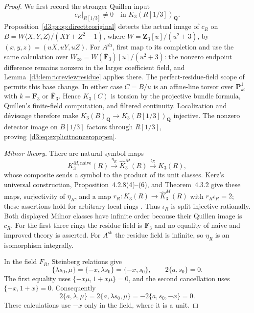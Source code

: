 \begin{proof}
We first record the stronger Quillen input
\begin{equation}\label{d3:eq:explicitnonzeropopen}
 c_R|_{R[1/3]}\ne0\quad\text{in }K_3(R[1/3])_{\mathbf Q}.
\end{equation}
Proposition~\ref{d3:prop:directtcoriginal} detects the actual image of
$c_R$ on
$B=W\langle X,Y,Z\rangle/(XY+Z^2-1)$, where
$W=\mathbf Z_3[u]/(u^2+3)$, by $(x,y,z)=(uX,uY,uZ)$.
For $A^{\mathrm{sh}}$, first map to its completion and use the same
calculation over
$W_\infty=W(\overline{\mathbf F}_3)[u]/(u^2+3)$:
the nonzero endpoint difference remains nonzero in the larger
coefficient field, and Lemma~\ref{d3:lem:tcreviewresidue} applies there.
The perfect-residue-field scope of
\cite[Proposition~4.10]{AMMN} permits this base change.
In either case $C=B/u$ is an affine-line torsor over
$\mathbf P^1_k$, with $k=\mathbf F_3$ or
$\overline{\mathbf F}_3$. Hence $K_3(C)$ is torsion by the projective
bundle formula, Quillen's finite-field computation, and filtered
continuity. Localization and d\'evissage therefore make
$K_3(B)_{\mathbf Q}\to K_3(B[1/3])_{\mathbf Q}$ injective.
The nonzero detector image on $B[1/3]$ factors through $R[1/3]$,
proving~\eqref{d3:eq:explicitnonzeropopen}.

\emph{Milnor theory.}
There are natural symbol maps
\[
 K_3^{M,\mathrm{naive}}(R)
 \xrightarrow{\eta_R}\widehat K_3^M(R)
 \xrightarrow{\iota_R}K_3(R),
\]
whose composite sends a symbol to the product of its unit classes.
Kerz's universal construction, Proposition~4.2.8(4)--(6), and
Theorem~4.3.2 give these maps, surjectivity of $\eta_R$, and a map
$r_R:K_3(R)\to\widehat K_3^M(R)$ with
$r_R\iota_R=2$; these assertions hold for arbitrary local rings
\cite[Theorem~4.2.5, Proposition~4.2.8, Theorem~4.3.2]{KerzThesis}.
Thus $\iota_R$ is split injective rationally. Both displayed Milnor
classes have infinite order because their Quillen image is $c_R$.
For the first three rings the residue field is $\mathbf F_3$ and no
equality of naive and improved theory is asserted. For
$A^{\mathrm{sh}}$ the residue field is infinite, so $\eta_R$ is an
isomorphism integrally.

In the field $F_R$, Steinberg relations give
\[
 \{\lambda s_0,\mu\}
 =\{-x,\lambda s_0\}=\{-x,s_0\},
 \qquad 2\{a,s_0\}=0.
\]
The first equality uses $\{-x\mu,1+x\mu\}=0$, and the second
cancellation uses $\{-x,1+x\}=0$. Consequently
\[
 2\{a,\lambda,\mu\}
 =2\{a,\lambda s_0,\mu\}
 =-2\{a,s_0,-x\}=0.
\]
These calculations use $-x$ only in the field, where it is a unit.


\end{proof}
